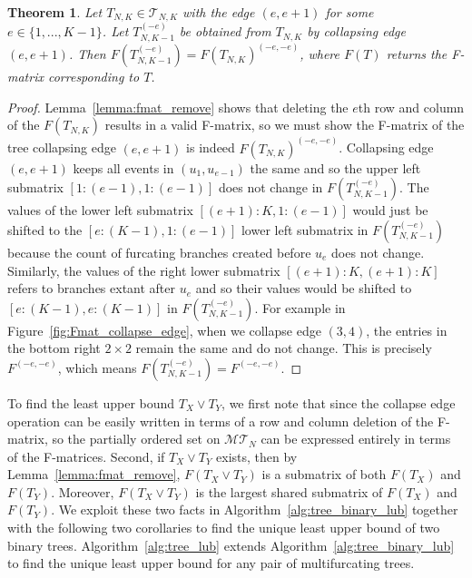 \documentclass{article}
\newtheorem{theorem}{Theorem}
\begin{document}
\begin{theorem} \label{thm:fmat_collapse}
Let $T_{N,K} \in \mathcal{T}_{N,K}$ with the edge $(e,e+1)$ for some $e \in \{1,...,K-1\}$. Let $T_{N,K-1}^{(-e)}$ be obtained from $T_{N,K}$ by collapsing edge $(e, e+1)$. Then $F(T_{N,K-1}^{(-e)})  = F(T_{N,K})^{(-e, -e)}$, where $F(T)$ returns the F-matrix corresponding to $T$. 
\end{theorem}
\begin{proof}
Lemma~\ref{lemma:fmat_remove} shows that deleting the $e$th row and column of the $F(T_{N,K})$ results in a valid F-matrix, so we must show the F-matrix of the tree collapsing edge $(e, e+1)$ is indeed $F(T_{N,K})^{(-e,-e)}$. Collapsing edge $(e, e+1)$ keeps all events in $(u_1, u_{e-1})$ the same and so the upper left submatrix $[1:(e-1),1:(e-1)]$ does not change in $F(T_{N,K-1}^{(-e)})$. The values of the lower left submatrix $[(e+1):K,1:(e-1)]$ would just be shifted to the $[e:(K-1),1:(e-1)]$ lower left submatrix in $F(T_{N,K-1}^{(-e)})$ because the count of furcating branches created before $u_{e}$ does not change. \\

\noindent Similarly, the values of the right lower submatrix $[(e+1):K,(e+1):K]$ refers to branches extant after $u_{e}$ and so their values would be shifted to $[e:(K-1),e:(K-1)]$ in $F(T_{N,K-1}^{(-e)})$. For example in Figure~\ref{fig:Fmat_collapse_edge}, when we collapse edge $(3,4)$, the entries in the bottom right $2\times 2$ remain the same and do not change. This is precisely $F^{(-e, -e)}$, which means $F(T_{N,K-1}^{(-e)}) = F^{(-e, -e)}$.
\end{proof}

To find the least upper bound $T_{X} \vee T_{Y}$, we first note that since the collapse edge operation can be easily written in terms of a row and column deletion of the F-matrix, so the partially ordered set on $\mathcal{MT}_N$ can be expressed entirely in terms of the F-matrices. Second, if $T_{X} \vee T_{Y}$ exists, then by Lemma~\ref{lemma:fmat_remove}, $F(T_{X}\vee T_{Y})$ is a submatrix of both $F(T_{X})$ and $F(T_{Y})$. Moreover, $F(T_{X}\vee T_{Y})$ is the largest shared submatrix of $F(T_{X})$ and $F(T_{Y})$. We exploit these two facts in Algorithm~\ref{alg:tree_binary_lub} together with the following two corollaries to find the unique least upper bound of two binary trees. Algorithm~\ref{alg:tree_lub} extends Algorithm~\ref{alg:tree_binary_lub} to find the unique least upper bound for any pair of multifurcating trees.
\end{document}
